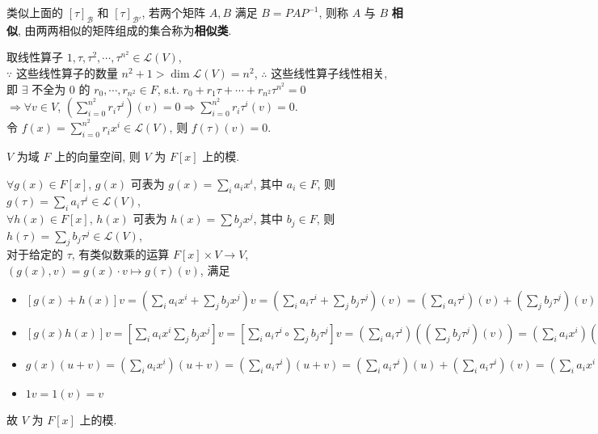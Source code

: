 \documentclass{note}
\begin{document}
\begin{df}[相似]
    类似上面的 $[\tau]_{\mathcal{B}}$ 和 $[\tau]_{\mathcal{B}'}$, 若两个矩阵 $A,B$ 满足 $B=PAP^{-1}$, 则称 $A$ 与 $B$ \textbf{相似}, 由两两相似的矩阵组成的集合称为\textbf{相似类}.
\end{df}

取线性算子 $1,\tau,\tau^2,\cdots,\tau^{n^2}\in\mathcal{L}(V)$,\\
$\because$ 这些线性算子的数量 $n^2+1>\dim\mathcal{L}(V)=n^2$, $\therefore$ 这些线性算子线性相关,\\
即 $\exists$ 不全为 $0$ 的 $r_0,\cdots,r_{n^2}\in F$, s.t. $r_0+r_1\tau+\cdots+r_{n^2}\tau^{n^2}=0$\\
$\Longrightarrow\forall v\in V$, $\left(\sum_{i=0}^{n^2}r_i\tau^i\right)(v)=0\Longrightarrow\sum_{i=0}^{n^2}r_i\tau^i(v)=0$.\\
令 $f(x)=\sum_{i=0}^{n^2}r_ix^i\in\mathcal{L}(V)$, 则 $f(\tau)(v)=0$.

\begin{thm}[(课本定理 7.5)]
    $V$ 为域 $F$ 上的向量空间, 则 $V$ 为 $F[x]$ 上的模.
\end{thm}
\begin{pf}
    $\forall g(x)\in F[x]$, $g(x)$ 可表为 $g(x)=\sum_ia_ix^i$, 其中 $a_i\in F$, 则 $g(\tau)=\sum_ia_i\tau^i\in\mathcal{L}(V)$,\\
    $\forall h(x)\in F[x]$, $h(x)$ 可表为 $h(x)=\sum b_jx^j$, 其中 $b_j\in F$, 则 $h(\tau)=\sum_jb_j\tau^j\in\mathcal{L}(V)$,\\
    对于给定的 $\tau$, 有类似数乘的运算 $F[x]\times V\rightarrow V$, $(g(x),v)=g(x)\cdot v\mapsto g(\tau)(v)$, 满足
    \begin{itemize}
        \item[(1)] $[g(x)+h(x)]v=\left(\sum_ia_ix^i+\sum_jb_jx^j\right)v=\left(\sum_ia_i\tau^i+\sum_jb_j\tau^j\right)(v)=\left(\sum_ia_i\tau^i\right)(v)+\left(\sum_jb_j\tau^j\right)(v)=\left(\sum_ia_ix^i\right)v+\left(\sum_jb_jx^j\right)v=g(x)v+h(x)v$
        \item[(2)] $[g(x)h(x)]v=\left[\sum_ia_ix^i\sum_jb_jx^j\right]v=\left[\sum_ia_i\tau^i\circ\sum_jb_j\tau^j\right]v=\left(\sum_ia_i\tau^i\right)\left(\left(\sum_jb_j\tau^j\right)(v)\right)=\left(\sum_ia_ix^i\right)\left(\left(\sum_jb_jx^j\right)v\right)=g(x)[h(x)v]$
        \item[(3)] $g(x)(u+v)=\left(\sum_ia_ix^i\right)(u+v)=\left(\sum_ia_i\tau^i\right)(u+v)=\left(\sum_ia_i\tau^i\right)(u)+\left(\sum_ia_i\tau^i\right)(v)=\left(\sum_ia_ix^i\right)u+\left(\sum_ia_ix^i\right)v=g(x)v+g(x)u$
        \item[(4)] $1v=1(v)=v$
    \end{itemize}
    故 $V$ 为 $F[x]$ 上的模.
\end{pf}
\end{document}
